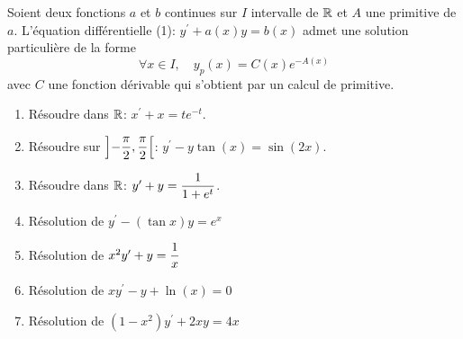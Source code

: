 \documentclass[a4paper, 11pt]{article}
\begin{document}
 {\noindent  

\begin{prop} 
Soient deux fonctions $a$ et $b$ continues sur $I$ intervalle de $\mathbb{R}$ et $A$ une primitive de $a$. L'\'equation diff\'erentielle (1): $y^{\prime}+a(x)y=b(x)$ admet une solution particuli\`ere de la forme 
$$\forall x\in I,\quad y_p(x)= C(x)e^{-A(x)}$$
avec $C$ une fonction d\'erivable qui s'obtient par un calcul de primitive.
\end{prop}
 
}\vsec\vsec


\setlength\fboxrule{1pt}
\setlength\fboxrule{0.5pt}

{\footnotesize \begin{exercice} 
\begin{enumerate}

\item R\'esoudre dans $\mathbb{R}$: $x^{\prime}+x=te^{-t}$.
\item R\'esoudre sur $\displaystyle \left\rbrack -\frac{\pi}{2},\frac{\pi}{2} \right\lbrack $: $y^{\prime}-y\tan{(x)}=\sin{(2x)}$. 
\item R\'esoudre dans $\mathbb{R}$: $y^{\prime}+y=\displaystyle\frac{1}{1+e^t}$. 
\item R\'esolution de $y^{\prime}-(\tan{x})y=e^x$
 

\item R\'esolution de $x^2y^{\prime}+y=\displaystyle\frac{1}{x}$
\item R\'esolution de $xy^{\prime}-y+\ln{(x)}=0$ 
\item R\'esolution de $(1-x^2)y^{\prime}+2xy=4x$ 
 
\end{enumerate}
\end{exercice}
}
\vsec\vsec

 
\end{document}

